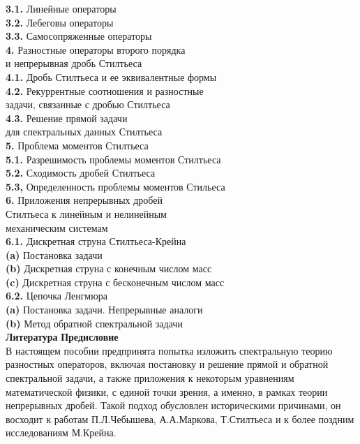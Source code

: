 \documentclass[12 pt, a4 paper]{article}
\theoremstyle{plain}   \newtheorem{Pro}{Задача}
\begin{document}
{\bfseries 3.1.}
Линейные операторы \\
{\bfseries 3.2.}
Лебеговы операторы \\
{\bfseries 3.3.}
Самосопряженные операторы
$$ \; $$
{\Large \bfseries 4.}
Разностные операторы второго порядка \\
и непрерывная дробь Стилтьеса \\
{\bfseries 4.1.}
Дробь Стилтьеса и ее эквивалентные формы \\
{\bfseries 4.2.}
Рекуррентные соотношения и разностные \\
задачи, связанные с дробью Стилтьеса \\
{\bfseries 4.3.}
Решение прямой задачи \\
для спектральных данных Стилтьеса
$$ \; $$
{\Large \bfseries 5.}
Проблема моментов Стилтьеса \\
{\bfseries 5.1.}
Разрешимость проблемы моментов Стилтьеса \\
{\bfseries 5.2.}
Сходимость дробей Стилтьеса \\
{\bfseries 5.3,}
Определенность проблемы моментов Стильеса
$$ \; $$
{\Large \bfseries 6.}
Приложения непрерывных дробей \\
Стилтьеса к линейным и нелинейным \\
механическим системам \\
{\bfseries 6.1.}
Дискретная струна Стилтьеса-Крейна \\
{\bfseries (a)}
Постановка задачи \\
{\bfseries (b)}
Дискретная струна с конечным числом масс \\
{\bfseries (c)}
Дискретная струна с бесконечным числом масс \\
{\bfseries 6.2.}
Цепочка Ленгмюра \\
{\bfseries (a)}
Постановка задачи. Непрерывные аналоги \\
{\bfseries (b)}
Метод обратной спектральной задачи
$$ \; $$
{\bfseries Литература}
\newpage
{\Large \bfseries Предисловие} \\

В настоящем пособии предпринята попытка изложить спектральную
теорию разностных операторов, включая постановку и решение
прямой и обратной спектральной задачи, а также приложения к
некоторым уравнениям математической физики, с единой точки зрения,
а именно, в рамках теории непрерывных дробей.
Такой подход обусловлен историческими причинами, он восходит к
работам П.Л.Чебышева, А.А.Маркова, Т.Стилтьеса и к более поздним
исследованиям М.Крейна. \\
\end{document}
